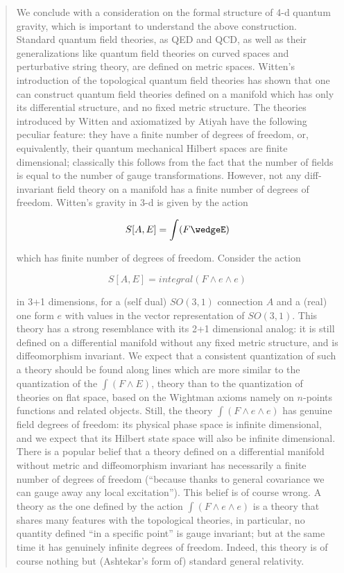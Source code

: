 \documentclass{article}
\begin{document}
\begin{quote}
We conclude with a consideration on the formal structure of 4-d quantum
gravity, which is important to understand the above construction.
Standard quantum field theories, as QED and QCD, as well as their
generalizations like quantum field theories on curved spaces and
perturbative string theory, are defined on metric spaces. Witten's
introduction of the topological quantum field theories has shown that
one can construct quantum field theories defined on a manifold which has
only its differential structure, and no fixed metric structure. The
theories introduced by Witten and axiomatized by Atiyah have the
following peculiar feature: they have a finite number of degrees of
freedom, or, equivalently, their quantum mechanical Hilbert spaces are
finite dimensional; classically this follows from the fact that the
number of fields is equal to the number of gauge transformations.
However, not any diff-invariant field theory on a manifold has a finite
number of degrees of freedom. Witten's gravity in 3-d is given by the
action

\[S[A,E] = \int(F\wedgeE)\]

which has finite number of degrees of freedom. Consider the action

\[S[A,E] = integral(F\wedge e\wedge e)\]

in 3+1 dimensions, for a (self dual) \(SO(3,1)\) connection \(A\) and a
(real) one form \(e\) with values in the vector representation of
\(SO(3,1)\). This theory has a strong resemblance with its 2+1
dimensional analog: it is still defined on a differential manifold
without any fixed metric structure, and is diffeomorphism invariant. We
expect that a consistent quantization of such a theory should be found
along lines which are more similar to the quantization of the
\(\int(F\wedge E)\), theory than to the quantization of theories on flat
space, based on the Wightman axioms namely on \(n\)-points functions and
related objects. Still, the theory \(\int(F\wedge e\wedge e)\) has
genuine field degrees of freedom: its physical phase space is infinite
dimensional, and we expect that its Hilbert state space will also be
infinite dimensional. There is a popular belief that a theory defined on
a differential manifold without metric and diffeomorphism invariant has
necessarily a finite number of degrees of freedom (``because thanks to
general covariance we can gauge away any local excitation''). This
belief is of course wrong. A theory as the one defined by the action
\(\int(F\wedge e\wedge e)\) is a theory that shares many features with
the topological theories, in particular, no quantity defined ``in a
specific point'' is gauge invariant; but at the same time it has
genuinely infinite degrees of freedom. Indeed, this theory is of course
nothing but (Ashtekar's form of) standard general relativity.


\end{quote}
\end{document}
